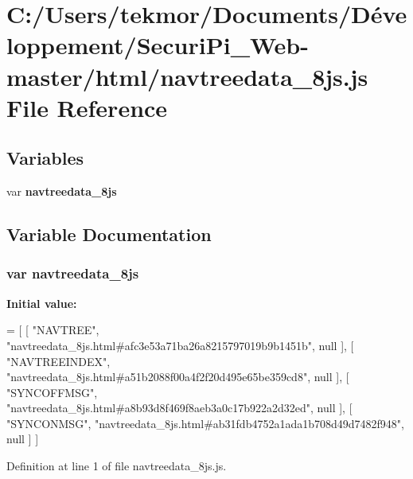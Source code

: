 \section{C\+:/\+Users/tekmor/\+Documents/\+Développement/\+Securi\+Pi\+\_\+\+Web-\/master/html/navtreedata\+\_\+8js.js File Reference}
\label{navtreedata__8js_8js}
\subsection*{Variables}
\begin{DoxyCompactItemize}
\item 
var {\bf navtreedata\+\_\+8js}
\end{DoxyCompactItemize}


\subsection{Variable Documentation}
\subsubsection[{navtreedata\+\_\+8js}]{\setlength{\rightskip}{0pt plus 5cm}var navtreedata\+\_\+8js}\label{navtreedata__8js_8js_a7c4917d3cc1dd3578a8cc3760c7bfc68}
{\bfseries Initial value\+:}
\begin{DoxyCode}
=
[
    [ \textcolor{stringliteral}{"NAVTREE"}, \textcolor{stringliteral}{"navtreedata\_8js.html#afc3e53a71ba26a8215797019b9b1451b"}, null ],
    [ \textcolor{stringliteral}{"NAVTREEINDEX"}, \textcolor{stringliteral}{"navtreedata\_8js.html#a51b2088f00a4f2f20d495e65be359cd8"}, null ],
    [ \textcolor{stringliteral}{"SYNCOFFMSG"}, \textcolor{stringliteral}{"navtreedata\_8js.html#a8b93d8f469f8aeb3a0c17b922a2d32ed"}, null ],
    [ \textcolor{stringliteral}{"SYNCONMSG"}, \textcolor{stringliteral}{"navtreedata\_8js.html#ab31fdb4752a1ada1b708d49d7482f948"}, null ]
]
\end{DoxyCode}


Definition at line 1 of file navtreedata\+\_\+8js.\+js.

